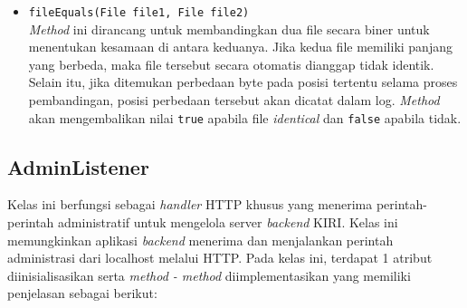 \begin{itemize}
\begin{itemize}
        \item \texttt{fileEquals(File file1, File file2)}
        \\ \textit{Method} ini dirancang untuk membandingkan dua file secara biner untuk menentukan kesamaan di antara keduanya. Jika kedua file memiliki panjang yang berbeda, maka file tersebut secara otomatis dianggap tidak identik. Selain itu, jika ditemukan perbedaan byte pada posisi tertentu selama proses pembandingan, posisi perbedaan tersebut akan dicatat dalam log. \textit{Method} akan mengembalikan nilai \texttt{true} apabila file \textit{identical} dan \texttt{false} apabila tidak.
        
    \end{itemize}
\end{itemize}

\subsection{AdminListener}
Kelas ini berfungsi sebagai \textit{handler} HTTP khusus yang menerima perintah-perintah administratif untuk mengelola server \textit{backend} KIRI. Kelas ini memungkinkan aplikasi \textit{backend} menerima dan menjalankan perintah administrasi dari localhost melalui HTTP. Pada kelas ini, terdapat 1 atribut diinisialisasikan serta \textit{method - method} diimplementasikan yang memiliki penjelasan sebagai berikut:
